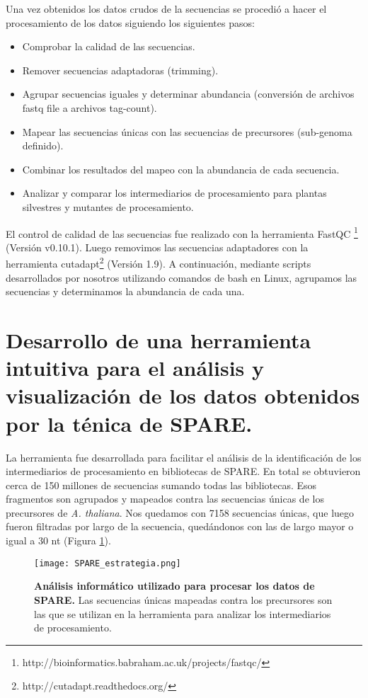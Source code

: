 Una vez obtenidos los datos crudos de la secuencias se procedió a hacer el procesamiento de los datos siguiendo los siguientes pasos:
\begin{itemize}
	\item Comprobar la calidad de las secuencias.
	\item Remover secuencias adaptadoras (trimming).
	\item Agrupar secuencias iguales y determinar abundancia (conversión de archivos fastq file a archivos tag-count).
	\item Mapear las secuencias únicas con las secuencias de precursores (sub-genoma definido).
	\item Combinar los resultados del mapeo con la abundancia de cada secuencia.
	\item Analizar y comparar los intermediarios de procesamiento para plantas silvestres y mutantes de procesamiento.
\end{itemize}

El control de calidad de las secuencias fue realizado con la herramienta FastQC \footnote{http://bioinformatics.babraham.ac.uk/projects/fastqc/} (Versión v0.10.1).
Luego removimos las secuencias adaptadores con la herramienta cutadapt\footnote{http://cutadapt.readthedocs.org/} (Versión 1.9).
A continuación, mediante scripts desarrollados por nosotros utilizando comandos de bash en Linux, agrupamos las secuencias y determinamos la abundancia de cada una.

\section {Desarrollo de una herramienta intuitiva para el análisis y visualización de los datos obtenidos por la ténica de SPARE.}

La herramienta fue desarrollada para facilitar el análisis de la identificación de los intermediarios de procesamiento en bibliotecas de SPARE.
En total se obtuvieron cerca de 150 millones de secuencias sumando todas las bibliotecas.
Esos fragmentos son agrupados y mapeados contra las secuencias únicas de los precursores de \textit{A. thaliana}.
Nos quedamos con 7158 secuencias únicas, que luego fueron filtradas por largo de la secuencia, quedándonos con las de largo mayor o igual a 30 nt (Figura \ref{fig:SPARE_estrategia}).

\begin{figure}[htbp!] 
	\centering    
	\texttt{[image: SPARE\_estrategia.png]}
	\caption[Análisis informático utilizado para procesar los datos de SPARE]{
	\textbf{Análisis informático utilizado para procesar los datos de SPARE.}
	Las secuencias únicas mapeadas contra los precursores son las que se utilizan en la herramienta para analizar los intermediarios de procesamiento.
	}
	 \label{fig:SPARE_estrategia}
\end{figure}

